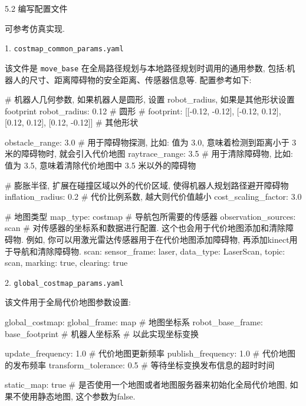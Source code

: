 \documentclass[openany, fontset=windowsold]{ctexbook}
\theoremstyle{kaiti}
\theoremstyle{normal}
\begin{document}

5.2 编写配置文件

可参考仿真实现.

1. \verb|costmap_common_params.yaml|

该文件是 \verb|move_base| 在全局路径规划与本地路径规划时调用的通用参数, 包括:机器人的尺寸、距离障碍物的安全距离、传感器信息等. 配置参考如下:

\begin{bash}
  # 机器人几何参数, 如果机器人是圆形, 设置 robot_radius, 如果是其他形状设置 footprint
  robot_radius: 0.12 # 圆形
  # footprint: [[-0.12, -0.12], [-0.12, 0.12], [0.12, 0.12], [0.12, -0.12]] # 其他形状

  obstacle_range: 3.0 # 用于障碍物探测, 比如: 值为 3.0, 意味着检测到距离小于 3 米的障碍物时, 就会引入代价地图
  raytrace_range: 3.5 # 用于清除障碍物, 比如: 值为 3.5, 意味着清除代价地图中 3.5 米以外的障碍物


  # 膨胀半径, 扩展在碰撞区域以外的代价区域, 使得机器人规划路径避开障碍物
  inflation_radius: 0.2
  # 代价比例系数, 越大则代价值越小
  cost_scaling_factor: 3.0

  # 地图类型
  map_type: costmap
  # 导航包所需要的传感器
  observation_sources: scan
  # 对传感器的坐标系和数据进行配置. 这个也会用于代价地图添加和清除障碍物. 例如, 你可以用激光雷达传感器用于在代价地图添加障碍物, 再添加kinect用于导航和清除障碍物.
  scan: {sensor_frame: laser, data_type: LaserScan, topic: scan, marking: true, clearing: true}
\end{bash}

2. \verb|global_costmap_params.yaml|

该文件用于全局代价地图参数设置:

\begin{bash}
  global_costmap:
    global_frame: map # 地图坐标系
    robot_base_frame: base_footprint # 机器人坐标系
    # 以此实现坐标变换

    update_frequency: 1.0 # 代价地图更新频率
    publish_frequency: 1.0 # 代价地图的发布频率
    transform_tolerance: 0.5 # 等待坐标变换发布信息的超时时间

    static_map: true # 是否使用一个地图或者地图服务器来初始化全局代价地图, 如果不使用静态地图, 这个参数为false.
\end{bash}
\end{document}
